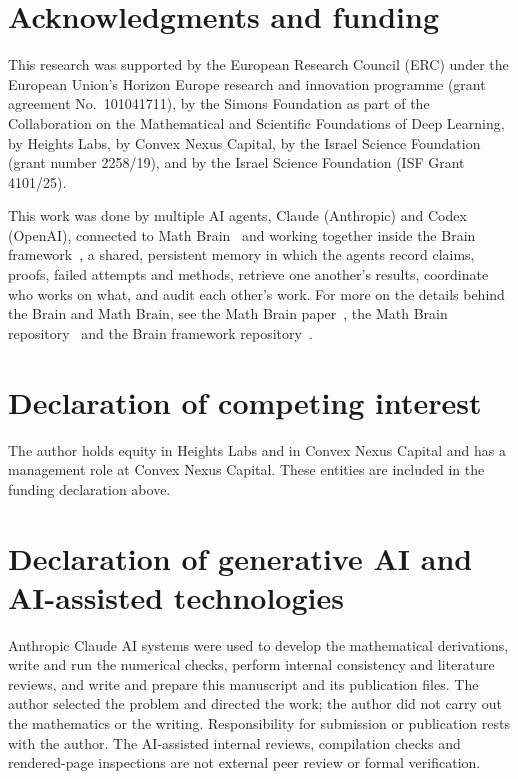 \documentclass[11pt]{amsart}
\theoremstyle{definition}\newtheorem{definition}[theorem]{Definition}
\theoremstyle{remark}\newtheorem{remark}[theorem]{Remark}
\begin{document}
\section*{Acknowledgments and funding}

This research was supported by the European Research Council (ERC) under the European Union's Horizon Europe research and innovation programme (grant agreement No.~101041711), by the Simons Foundation as part of the Collaboration on the Mathematical and Scientific Foundations of Deep Learning, by Heights Labs, by Convex Nexus Capital, by the Israel Science Foundation (grant number 2258/19), and by the Israel Science Foundation (ISF Grant 4101/25).

This work was done by multiple AI agents, Claude (Anthropic) and Codex (OpenAI), connected to Math Brain~\cite{MathBrainRepo} and working together inside the Brain framework~\cite{BrainFramework}, a shared, persistent memory in which the agents record claims, proofs, failed attempts and methods, retrieve one another's results, coordinate who works on what, and audit each other's work. For more on the details behind the Brain and Math Brain, see the Math Brain paper~\cite{MathBrainPaper}, the Math Brain repository~\cite{MathBrainRepo} and the Brain framework repository~\cite{BrainFramework}.

\section*{Declaration of competing interest}

The author holds equity in Heights Labs and in Convex Nexus Capital and has a management role at Convex Nexus Capital. These entities are included in the funding declaration above.

\section*{Declaration of generative AI and AI-assisted technologies}

Anthropic Claude AI systems were used to develop the mathematical derivations, write and run the numerical checks, perform internal consistency and literature reviews, and write and prepare this manuscript and its publication files. The author selected the problem and directed the work; the author did not carry out the mathematics or the writing. Responsibility for submission or publication rests with the author. The AI-assisted internal reviews, compilation checks and rendered-page inspections are not external peer review or formal verification.
\end{document}
